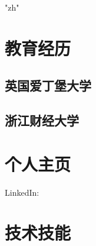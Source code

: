\documentclass[12pt,a4paper]{resume}
\begin{document}
\XeTeXlinebreaklocale "zh"

%
%

\vspace{3pt}
\subtitle{1991年, 男, 现居上海}
\vspace{3pt}
\subtitle{电话: 15867835270}
\vspace{3pt}
\subtitle{邮箱: junjieyemain@outlook.com}

\indent\makebox[\linewidth]{\rule{\paperwidth}{0.3pt}}



%
%
\begin{minipage}[t]{0.32\textwidth} 

\section{教育经历}

\subsection{英国爱丁堡大学}
\subtitle{理学硕士 \hfill 2014年9月 - 2015年11月}
\sectionsep

\subsection{浙江财经大学}
\subtitle{本科双学位 \hfill 2010年9月 - 2014年6月}
\sectionsep

\section{个人主页}
LinkedIn:  \href{https://www.linkedin.com/in/junjie-ye-49477b126/}{}

\sectionsep

\section{技术技能}


\end{minipage}
\end{document}
